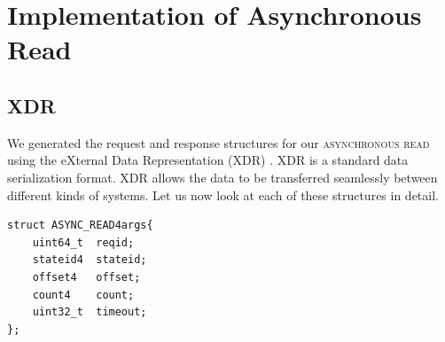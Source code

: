 \section{Implementation of Asynchronous Read}
\subsection{XDR}
We generated the request and response structures for our \textsc{asynchronous read} using the eXternal Data Representation (XDR) \cite{XDR}. XDR is a standard data serialization format. XDR allows the data to be transferred seamlessly between different kinds of systems. Let us now look at each of these structures in detail.

\begin{lstlisting}
struct ASYNC_READ4args{
	uint64_t  reqid; 
	stateid4  stateid; 
	offset4	  offset; 
	count4	  count;
	uint32_t  timeout; 
};
\end{lstlisting}

